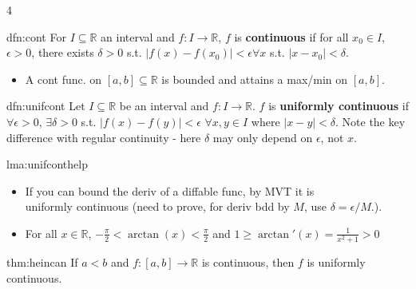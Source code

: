\documentclass[landscape, 8pt]{extarticle}
\begin{document}
\begin{multicols*}{4}
		
		
		\begin{dfn}[Continuity]{dfn:cont}{ }
		For $I \subseteq \mathbb{R}$ an interval and $f: I \to \mathbb{R}$, $f$ is \textbf{continuous} if for all $x_0\in I$, $\epsilon > 0$, there exists $\delta > 0$ s.t. $\left|f(x) - f(x_0)\right| <\epsilon \forall x$ s.t. $\left|x-x_0\right| < \delta$.
		\begin{itemize}
			\item A cont func. on $[a, b] \subseteq \mathbb{R}$ is bounded and attains a max/min on $[a, b]$.
		\end{itemize}
		
		\end{dfn}
		
		
		\begin{mdfn}{dfn:unifcont}{ }
		Let $I \subseteq \mathbb{R}$ be an interval and $f: I \to \mathbb{R}$. $f$ is \textbf{uniformly continuous} if $\forall \epsilon > 0$, $\exists \delta > 0$ s.t. $\left|f(x) - f(y)\right| <\epsilon$ $\forall x, y \in I$ where $\left|x-y\right| < \delta$. Note the key difference with regular continuity - here $\delta$ may only depend on $\epsilon$, not $x$.
		
		\end{mdfn}
		
		
		\begin{lma}{lma:unifconthelp}{ }
		\begin{itemize}
			\item If you can bound the deriv of a diffable func, by MVT it is\\
			uniformly continuous (need to prove, for deriv bdd by $M$, use $\delta =\epsilon/M$.).
			\item For all $x\in \mathbb{R}$, $-\frac{\pi}{2} < \arctan(x) < \frac{\pi}{2}$ and $1 \ge \arctan'(x) = \frac{1}{x^2 + 1} > 0$
		\end{itemize}
		
		\end{lma}
		
		
		\begin{thm}{thm:heincan}{ }
		If $a < b$ and $f: [a, b] \to \mathbb{R}$ is continuous, then $f$ is uniformly continuous.
		
		\end{thm}
		

\end{multicols*}
\end{document}
